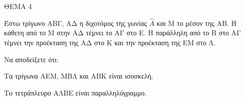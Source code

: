 
ΘΕΜΑ 4

Έστω τρίγωνο ΑΒΓ, ΑΔ η διχοτόμος της γωνίας $\widehat{Α}$ και Μ το μέσον της ΑΒ. Η κάθετη από το Μ στην ΑΔ τέμνει το ΑΓ στο Ε. Η παράλληλη από το Β στο ΑΓ τέμνει την προέκταση της ΑΔ στο Κ και την προέκταση της ΕΜ στο Λ.

Να αποδείξετε ότι:

\begin{alist}
\item Τα τρίγωνα ΑΕΜ, ΜΒΛ και ΑΒΚ είναι ισοσκελή. 

\item Το τετράπλευρο ΑΛΒΕ είναι παραλληλόγραμμο. 


\end{alist}
